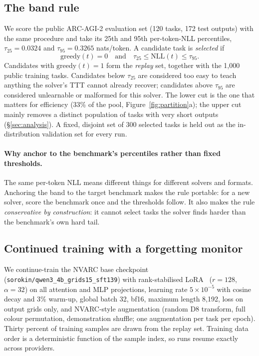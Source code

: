 \documentclass[11pt]{article}
\newcommand{\nvarc}{NVARC}
\begin{document}
\subsection{The band rule}
We score the public ARC-AGI-2 evaluation set (120 tasks, 172 test outputs) with the same procedure and take its 25th and 95th per-token-NLL percentiles, $\tau_{25}=0.0324$ and $\tau_{95}=0.3265$ nats/token. A candidate task is \emph{selected} if
\begin{equation}
\mathrm{greedy}(t)=0 \quad\text{and}\quad \tau_{25}\le\mathrm{NLL}(t)\le\tau_{95}.
\label{eq:band}
\end{equation}
Candidates with $\mathrm{greedy}(t)=1$ form the \emph{replay} set, together with the 1{,}000 public training tasks. Candidates below $\tau_{25}$ are considered too easy to teach anything the solver's TTT cannot already recover; candidates above $\tau_{95}$ are considered unlearnable or malformed for this solver. The lower cut is the one that matters for efficiency (33\% of the pool, Figure~\ref{fig:partition}a); the upper cut mainly removes a distinct population of tasks with very short outputs (\S\ref{sec:analysis}). A fixed, disjoint set of 300 selected tasks is held out as the in-distribution validation set for every run.

\paragraph{Why anchor to the benchmark's percentiles rather than fixed thresholds.}
The same per-token NLL means different things for different solvers and formats. Anchoring the band to the target benchmark makes the rule portable: for a new solver, score the benchmark once and the thresholds follow. It also makes the rule \emph{conservative by construction}: it cannot select tasks the solver finds harder than the benchmark's own hard tail.

\subsection{Continued training with a forgetting monitor}
We continue-train the \nvarc{} base checkpoint (\texttt{sorokin/qwen3\_4b\_grids15\_sft139}) with rank-stabilised LoRA~\citep{hu2022lora,kalajdzievski2023rslora} ($r{=}128$, $\alpha{=}32$) on all attention and MLP projections, learning rate $5\times10^{-5}$ with cosine decay and 3\% warm-up, global batch 32, bf16, maximum length 8{,}192, loss on output grids only, and \nvarc{}-style augmentation (random D8 transform, full colour permutation, demonstration shuffle; one augmentation per task per epoch). Thirty percent of training samples are drawn from the replay set. Training data order is a deterministic function of the sample index, so runs resume exactly across providers.
\end{document}
